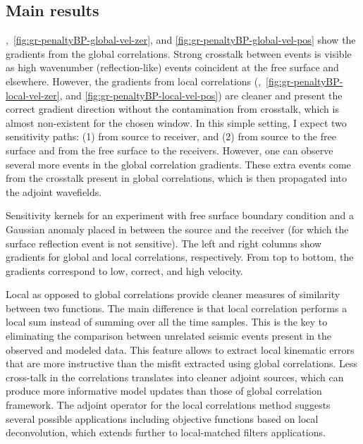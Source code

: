 \subsection{Main results}

,~\ref{fig:gr-penaltyBP-global-vel-zer},
and \ref{fig:gr-penaltyBP-global-vel-pos} show the gradients from the global
correlations. Strong crosstalk between events is visible as high wavenumber
(reflection-like) events coincident at the free surface and elsewhere. However, the gradients
from local correlations (,~\ref{fig:gr-penaltyBP-local-vel-zer},
and \ref{fig:gr-penaltyBP-local-vel-pos}) are cleaner and present the correct gradient direction
without the contamination from crosstalk, which is almost non-existent for the
chosen window.
 In this simple setting, I expect two sensitivity paths:
(1) from source to receiver, and (2) from source to the free surface and
from the free surface to the receivers. However, one can observe several more
events in the global correlation gradients. These extra events come from the
crosstalk present in global correlations, which is then propagated into the
adjoint wavefields. 

 {Sensitivity kernels for an
experiment with free surface boundary condition and a Gaussian anomaly placed
in between the source and the receiver (for which the surface reflection
event is not sensitive). The left and right columns show gradients for global
 and local correlations, respectively. From top to bottom, the
gradients correspond to low, correct, and high velocity.}


Local as opposed to global correlations provide cleaner measures of similarity
between two functions. The main difference is that local correlation performs
a local sum instead of summing over all the time samples. This is the key to
eliminating the comparison between unrelated seismic events present in the
observed and modeled data. This feature allows to extract local kinematic
errors that are more instructive than the misfit extracted using global
correlations. Less cross-talk in the correlations translates into cleaner
adjoint sources, which can produce more informative model updates than those of
global correlation framework.
 The adjoint operator for the local correlations method suggests several
possible applications including objective functions based on local deconvolution,
 which extends further to local-matched filters applications. 








